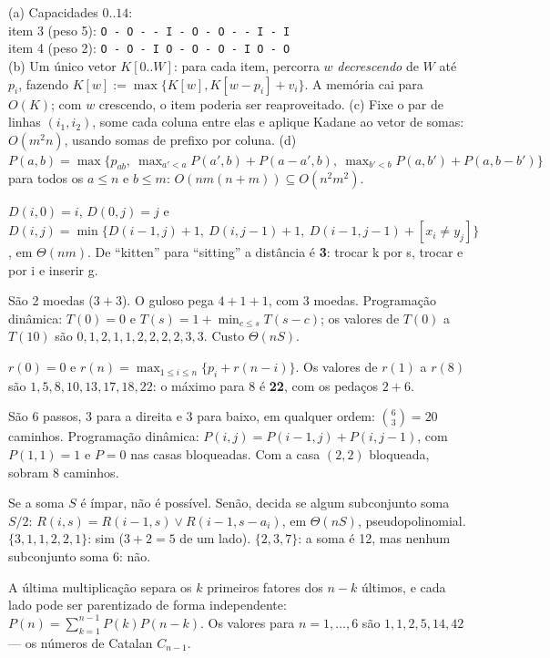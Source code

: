  (a) Capacidades $0..14$:\\
\hspace*{1em}item 3 (peso 5): \texttt{O - O - - I - O - O - - I - I}\\
\hspace*{1em}item 4 (peso 2): \texttt{O - O - I O - O - O - I O - O}\\
(b) Um único vetor $K[0..W]$: para cada item, percorra $w$ \emph{decrescendo} de $W$ até $p_i$, fazendo $K[w]:=\max\{K[w],K[w-p_i]+v_i\}$. A memória cai para $O(K)$; com $w$ crescendo, o item poderia ser reaproveitado. (c) Fixe o par de linhas $(i_1,i_2)$, some cada coluna entre elas e aplique Kadane ao vetor de somas: $O(m^2n)$, usando somas de prefixo por coluna. (d) $P(a,b)=\max\{p_{ab},\ \max_{a'<a}P(a',b)+P(a-a',b),\ \max_{b'<b}P(a,b')+P(a,b-b')\}$ para todos os $a\le n$ e $b\le m$: $O(nm(n+m))\subseteq O(n^2m^2)$.

 $D(i,0)=i$, $D(0,j)=j$ e $D(i,j)=\min\{D(i-1,j)+1,\ D(i,j-1)+1,\ D(i-1,j-1)+[x_i\ne y_j]\}$, em $\Theta(nm)$. De ``kitten'' para ``sitting'' a distância é \textbf{3}: trocar k por s, trocar e por i e inserir g.

 São 2 moedas ($3+3$). O guloso pega $4+1+1$, com 3 moedas. Programação dinâmica: $T(0)=0$ e $T(s)=1+\min_{c\le s}T(s-c)$; os valores de $T(0)$ a $T(10)$ são $0,1,2,1,1,2,2,2,2,3,3$. Custo $\Theta(nS)$.

 $r(0)=0$ e $r(n)=\max_{1\le i\le n}\{p_i+r(n-i)\}$. Os valores de $r(1)$ a $r(8)$ são $1,5,8,10,13,17,18,22$: o máximo para 8 é \textbf{22}, com os pedaços $2+6$.

 São 6 passos, 3 para a direita e 3 para baixo, em qualquer ordem: $\binom63=20$ caminhos. Programação dinâmica: $P(i,j)=P(i-1,j)+P(i,j-1)$, com $P(1,1)=1$ e $P=0$ nas casas bloqueadas. Com a casa $(2,2)$ bloqueada, sobram 8 caminhos.

 Se a soma $S$ é ímpar, não é possível. Senão, decida se algum subconjunto soma $S/2$: $R(i,s)=R(i-1,s)\lor R(i-1,s-a_i)$, em $\Theta(nS)$, pseudopolinomial. $\{3,1,1,2,2,1\}$: sim ($3+2=5$ de um lado). $\{2,3,7\}$: a soma é 12, mas nenhum subconjunto soma 6: não.

 A última multiplicação separa os $k$ primeiros fatores dos $n-k$ últimos, e cada lado pode ser parentizado de forma independente: $P(n)=\sum_{k=1}^{n-1}P(k)P(n-k)$. Os valores para $n=1,\dots,6$ são $1,1,2,5,14,42$ --- os números de Catalan $C_{n-1}$.

